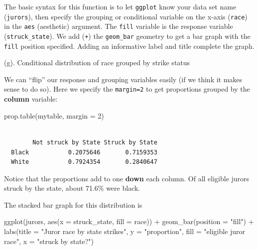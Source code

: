 \documentclass[
]{book}
\newenvironment{Shaded}{\begin{snugshade}}{\end{snugshade}}
\newcommand{\AttributeTok}[1]{\textcolor[rgb]{0.77,0.63,0.00}{#1}}
\newcommand{\DecValTok}[1]{\textcolor[rgb]{0.00,0.00,0.81}{#1}}
\newcommand{\FunctionTok}[1]{\textcolor[rgb]{0.00,0.00,0.00}{#1}}
\newcommand{\NormalTok}[1]{#1}
\newcommand{\SpecialCharTok}[1]{\textcolor[rgb]{0.00,0.00,0.00}{#1}}
\newcommand{\StringTok}[1]{\textcolor[rgb]{0.31,0.60,0.02}{#1}}
\begin{document}
The basic syntax for this function is to let \texttt{ggplot} know your data set name (\texttt{jurors}), then specify the grouping or conditional variable on the x-axis (\texttt{race}) in the \texttt{aes} (aesthetic) argument. The \texttt{fill} variable is the response variable (\texttt{struck\_state}). We add (\texttt{+}) the \texttt{geom\_bar} geometry to get a bar graph with the \texttt{fill} position specified. Adding an informative label and title complete the graph.

(g). Conditional distribution of race grouped by strike status

We can ``flip'' our response and grouping variables easily (if we think it makes sense to do so). Here we specify the \texttt{margin=2} to get proportions grouped by the \textbf{column} variable:

\begin{Shaded}
\begin{Highlighting}[]
\FunctionTok{prop.table}\NormalTok{(mytable, }\AttributeTok{margin =} \DecValTok{2}\NormalTok{)}
\end{Highlighting}
\end{Shaded}

\begin{verbatim}
       
        Not struck by State Struck by State
  Black           0.2075646       0.7159353
  White           0.7924354       0.2840647
\end{verbatim}

Notice that the proportions add to one \textbf{down} each column. Of all eligible jurors struck by the state, about 71.6\% were black.

The stacked bar graph for this distribution is

\begin{Shaded}
\begin{Highlighting}[]
\FunctionTok{ggplot}\NormalTok{(jurors, }\FunctionTok{aes}\NormalTok{(}\AttributeTok{x =}\NormalTok{ struck\_state, }\AttributeTok{fill =}\NormalTok{ race)) }\SpecialCharTok{+} 
  \FunctionTok{geom\_bar}\NormalTok{(}\AttributeTok{position =} \StringTok{"fill"}\NormalTok{) }\SpecialCharTok{+} 
  \FunctionTok{labs}\NormalTok{(}\AttributeTok{title =} \StringTok{"Juror race by state strikes"}\NormalTok{, }\AttributeTok{y =} \StringTok{"proportion"}\NormalTok{, }
       \AttributeTok{fill =} \StringTok{"eligible juror race"}\NormalTok{, }\AttributeTok{x =} \StringTok{"struck by state?"}\NormalTok{)}
\end{Highlighting}
\end{Shaded}
\end{document}
